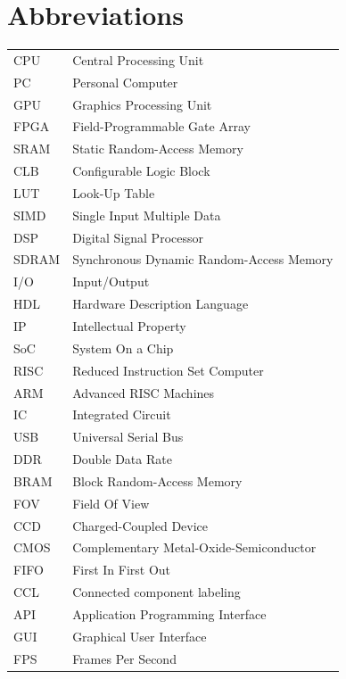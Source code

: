 \documentclass[12pt]{report}
\begin{document}
\section*{Abbreviations}
\begin{table}[h]
    \begin{tabular}{ll}
        CPU&Central Processing Unit\\
        PC&Personal Computer\\
        GPU&Graphics Processing Unit\\
        FPGA&Field-Programmable Gate Array\\
        SRAM&Static Random-Access Memory\\
        CLB&Configurable Logic Block\\
        LUT&Look-Up Table\\
        SIMD&Single Input Multiple Data\\
        DSP&Digital Signal Processor\\
        SDRAM&Synchronous Dynamic Random-Access Memory\\
        I/O&Input/Output\\
        HDL&Hardware Description Language\\
        IP&Intellectual Property\\
        SoC&System On a Chip\\
        RISC&Reduced Instruction Set Computer\\
        ARM&Advanced RISC Machines\\
        IC&Integrated Circuit\\
        USB&Universal Serial Bus\\
        DDR&Double Data Rate\\
        BRAM&Block Random-Access Memory\\
        FOV&Field Of View\\
        CCD&Charged-Coupled Device\\
        CMOS&Complementary Metal-Oxide-Semiconductor\\
        FIFO&First In First Out\\
        CCL&Connected component labeling\\
        API&Application Programming Interface\\
        GUI&Graphical User Interface\\
        FPS&Frames Per Second\\
    \end{tabular}
\end{table}
\tableofcontents
\listoffigures
\listoftables
\end{document}
